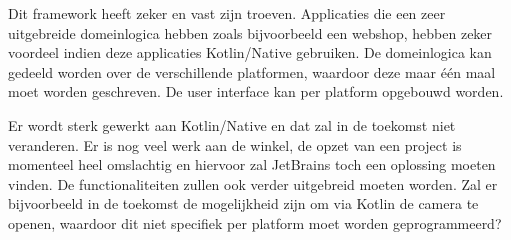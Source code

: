 Dit framework heeft zeker en vast zijn troeven. Applicaties die een zeer uitgebreide domeinlogica hebben zoals bijvoorbeeld een webshop, hebben zeker voordeel indien deze applicaties Kotlin/Native gebruiken. De domeinlogica kan gedeeld worden over de verschillende platformen, waardoor deze maar één maal moet worden geschreven. De user interface kan per platform opgebouwd worden. 

Er wordt sterk gewerkt aan Kotlin/Native en dat zal in de toekomst niet veranderen. Er is nog veel werk aan de winkel, de opzet van een project is momenteel heel omslachtig en hiervoor zal JetBrains toch een oplossing moeten vinden. De functionaliteiten zullen ook verder uitgebreid moeten worden. Zal er bijvoorbeeld in de toekomst de mogelijkheid zijn om via Kotlin de camera te openen, waardoor dit niet specifiek per platform moet worden geprogrammeerd?